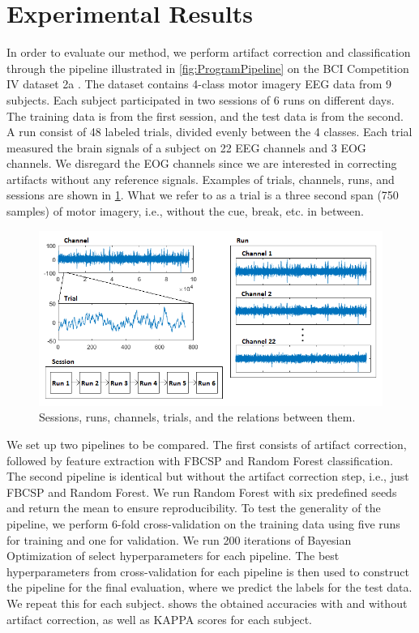 \section{Experimental Results}\label{sec:results}
In order to evaluate our method, we perform artifact correction and classification through the pipeline illustrated in \cref{fig:ProgramPipeline} on the BCI Competition IV dataset 2a \citep{brunner2008bci}. The dataset contains 4-class motor imagery EEG data from 9 subjects. Each subject participated in two sessions of 6 runs on different days. The training data is from the first session, and the test data is from the second. A run consist of 48 labeled trials, divided evenly between the 4 classes. Each trial measured the brain signals of a subject on 22 EEG channels and 3 EOG channels. We disregard the EOG channels since we are interested in correcting artifacts without any reference signals. Examples of trials, channels, runs, and sessions are shown in \cref{fig:dataset}. What we refer to as a trial is a three second span (750 samples) of motor imagery, i.e., without the cue, break, etc. in between.

\begin{figure}
	\centering
	\begin{adjustbox}{width=\textwidth}
		\includegraphics{figures/bciiv2a.png}
	\end{adjustbox}
	\caption{Sessions, runs, channels, trials, and the relations between them.}
	\label{fig:dataset}
\end{figure}

We set up two pipelines to be compared. The first consists of artifact correction, followed by feature extraction with FBCSP and Random Forest classification. The second pipeline is identical but without the artifact correction step, i.e., just FBCSP and Random Forest. We run Random Forest with six predefined seeds and return the mean to ensure reproducibility.
To test the generality of the pipeline, we perform 6-fold cross-validation on the training data using five runs for training and one for validation. We run 200 iterations of Bayesian Optimization of select hyperparameters for each pipeline. The best hyperparameters from cross-validation for each pipeline is then used to construct the pipeline for the final evaluation, where we predict the labels for the test data. We repeat this for each subject. 
 shows the obtained accuracies with and without artifact correction, as well as KAPPA scores for each subject.

